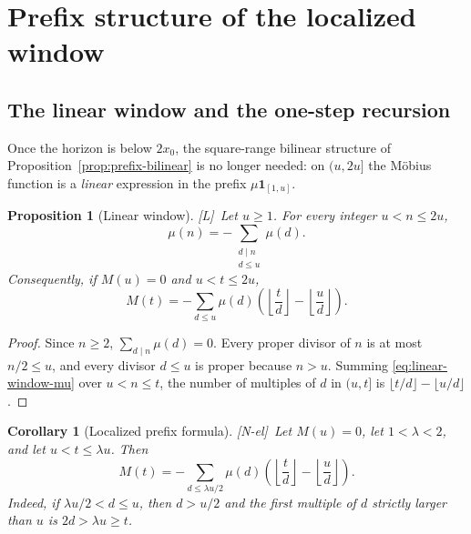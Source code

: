 \documentclass[11pt]{amsart}
\numberwithin{equation}{section}
\theoremstyle{plain}
\newtheorem{proposition}[theorem]{Proposition}
\newtheorem{corollary}[theorem]{Corollary}
\theoremstyle{definition}
\theoremstyle{remark}
\newcommand{\tagNE}{\textup{[N-el]}}
\newcommand{\tagL}{\textup{[L]}}
\begin{document}
\section{Prefix structure of the localized window}
\label{sec:prefix}

\subsection{The linear window and the one-step recursion}
\label{subsec:linear-window}

Once the horizon is below $2x_0$, the square-range bilinear structure of
Proposition~\ref{prop:prefix-bilinear} is no longer needed: on $(u,2u]$ the
M\"obius function is a \emph{linear} expression in the prefix
$\mu\mathbf 1_{[1,u]}$.

\begin{proposition}[Linear window]
\label{prop:linear-window}
\tagL\ Let $u\ge1$. For every integer $u<n\le2u$,
\begin{equation}
\label{eq:linear-window-mu}
\mu(n)=-\sum_{\substack{d\mid n\\ d\le u}}\mu(d).
\end{equation}
Consequently, if $M(u)=0$ and $u<t\le2u$,
\begin{equation}
\label{eq:linear-window-M}
M(t)=-\sum_{d\le u}\mu(d)\left(\left\lfloor\frac td\right\rfloor
-\left\lfloor\frac ud\right\rfloor\right).
\end{equation}
\end{proposition}

\begin{proof}
Since $n\ge2$, $\sum_{d\mid n}\mu(d)=0$. Every proper divisor of $n$ is at
most $n/2\le u$, and every divisor $d\le u$ is proper because $n>u$. Summing
\eqref{eq:linear-window-mu} over $u<n\le t$, the number of multiples of $d$
in $(u,t]$ is $\lfloor t/d\rfloor-\lfloor u/d\rfloor$.
\end{proof}

\begin{corollary}[Localized prefix formula]
\label{cor:localized-prefix}
\tagNE\ Let $M(u)=0$, let $1<\lambda<2$, and let $u<t\le\lambda u$.  Then
\begin{equation}
\label{eq:localized-prefix}
M(t)=-\sum_{d\le\lambda u/2}\mu(d)
\left(\left\lfloor\frac td\right\rfloor-
\left\lfloor\frac ud\right\rfloor\right).
\end{equation}
Indeed, if $\lambda u/2<d\le u$, then $d>u/2$ and the first multiple of
$d$ strictly larger than $u$ is $2d>\lambda u\ge t$.
\end{corollary}
\end{document}
